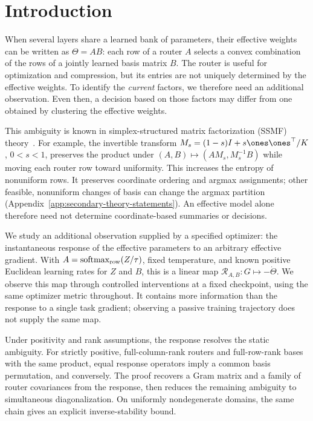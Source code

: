 \section{Introduction}

When several layers share a learned bank of parameters, their effective
weights can be written as $\Theta=AB$: each row of a router $A$ selects a
convex combination of the rows of a jointly learned basis matrix $B$.
The router is useful for optimization and compression, but its entries are
not uniquely determined by the effective weights. To identify the
\emph{current} factors, we therefore need an additional observation.
Even then, a decision based on those factors may differ from one obtained
by clustering the effective weights.

This ambiguity is known in simplex-structured matrix factorization
(SSMF) theory~\citep{vuthanh2023bounded}. For example, the invertible
transform $M_s=(1-s)I+s\ones\ones^\top/K$, $0<s<1$, preserves the product
under $(A,B)\mapsto(AM_s,M_s^{-1}B)$ while moving each router row toward
uniformity. This increases the entropy of nonuniform rows. It preserves
coordinate ordering and argmax assignments; other feasible, nonuniform
changes of basis can change the argmax partition
(Appendix~\ref{app:secondary-theory-statements}). An effective model alone
therefore need not determine coordinate-based summaries or decisions.

We study an additional observation supplied by a specified optimizer:
the instantaneous response of the effective parameters to an arbitrary
effective gradient. With $A=\operatorname{softmax}_{\rm row}(Z/\tau)$,
fixed temperature, and known positive Euclidean learning rates for $Z$ and
$B$, this is a linear map $\mathcal R_{A,B}:G\mapsto-\dot\Theta$.
We observe this map through controlled interventions at a fixed checkpoint,
using the same optimizer metric throughout. It contains more information
than the response to a single task gradient; observing a passive training
trajectory does not supply the same map.

Under positivity and rank assumptions, the response resolves the static ambiguity.
For strictly positive, full-column-rank routers and full-row-rank bases
with the same product, equal response operators imply a common basis
permutation, and conversely. The proof recovers a Gram matrix and a family
of router covariances from the response, then reduces the remaining
ambiguity to simultaneous diagonalization. On uniformly nondegenerate
domains, the same chain gives an explicit inverse-stability bound.


